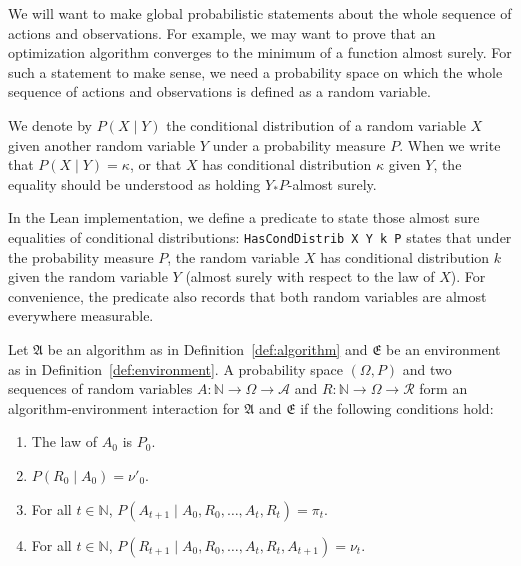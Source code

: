 We will want to make global probabilistic statements about the whole sequence of actions and observations.
For example, we may want to prove that an optimization algorithm converges to the minimum of a function almost surely.
For such a statement to make sense, we need a probability space on which the whole sequence of actions and observations is defined as a random variable.

We denote by $P(X \mid Y)$ the conditional distribution of a random variable $X$ given another random variable $Y$ under a probability measure $P$.
When we write that $P(X \mid Y) = \kappa$, or that $X$ has conditional distribution $\kappa$ given $Y$, the equality should be understood as holding $Y_* P$-almost surely.


\begin{remark}
In the Lean implementation, we define a predicate to state those almost sure equalities of conditional distributions: \texttt{HasCondDistrib X Y k P} states that under the probability measure $P$, the random variable $X$ has conditional distribution $k$ given the random variable $Y$ (almost surely with respect to the law of $X$).
For convenience, the predicate also records that both random variables are almost everywhere measurable.
\end{remark}


\begin{definition}\label{def:IsAlgEnvSeq}
  \leanok
Let $\mathfrak{A}$ be an algorithm as in Definition~\ref{def:algorithm} and $\mathfrak{E}$ be an environment as in Definition~\ref{def:environment}.
A probability space $(\Omega, P)$ and two sequences of random variables $A : \mathbb{N} \to \Omega \to \mathcal{A}$ and $R : \mathbb{N} \to \Omega \to \mathcal{R}$ form an algorithm-environment interaction for $\mathfrak{A}$ and $\mathfrak{E}$ if the following conditions hold:
\begin{enumerate}
  \item The law of $A_0$ is $P_0$.
  \item $P \left( R_0 \mid A_0 \right) = \nu'_0$.
  \item For all $t \in \mathbb{N}$, $P\left(A_{t+1} \mid A_0, R_0, \ldots, A_t, R_t \right) = \pi_t$.
  \item For all $t \in \mathbb{N}$, $P\left(R_{t+1} \mid A_0, R_0, \ldots, A_t, R_t, A_{t+1}\right) = \nu_t$.
\end{enumerate}
\end{definition}


